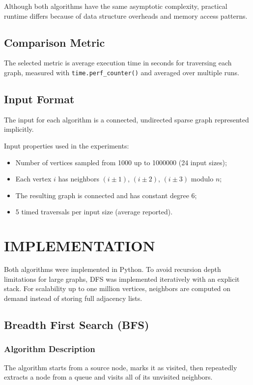 \documentclass{labreport}
\begin{document}
Although both algorithms have the same asymptotic complexity, practical runtime differs because of data structure overheads and memory access patterns.

\subsection{Comparison Metric}
The selected metric is average execution time in seconds for traversing each graph, measured with \texttt{time.perf\_counter()} and averaged over multiple runs.

\subsection{Input Format}
The input for each algorithm is a connected, undirected sparse graph represented implicitly.

Input properties used in the experiments:
\begin{itemize}
    \item Number of vertices sampled from 1000 up to 1000000 (24 input sizes);
    \item Each vertex $i$ has neighbors $(i \pm 1)$, $(i \pm 2)$, $(i \pm 3)$ modulo $n$;
    \item The resulting graph is connected and has constant degree 6;
    \item 5 timed traversals per input size (average reported).
\end{itemize}

\newpage
\section{IMPLEMENTATION}

Both algorithms were implemented in Python. To avoid recursion depth limitations for large graphs, DFS was implemented iteratively with an explicit stack. For scalability up to one million vertices, neighbors are computed on demand instead of storing full adjacency lists.

\subsection{Breadth First Search (BFS)}

\subsubsection{Algorithm Description}
The algorithm starts from a source node, marks it as visited, then repeatedly extracts a node from a queue and visits all of its unvisited neighbors.
\end{document}

